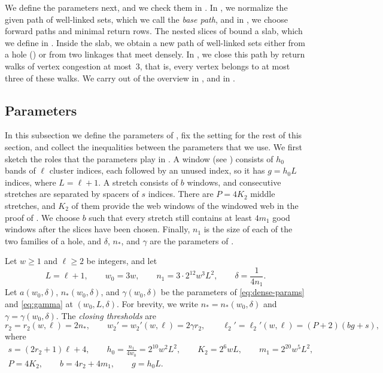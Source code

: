 \documentclass[fontsize=12pt,leading=14pt]{fullpaper}
\newcounter{step}
\begin{document}
We define the parameters next, and we check them in .
In , we normalize the given path of well-linked sets, which we call the \emph{base path}, and in , we choose forward paths and minimal return rows.
The nested slices of  bound a slab, which we define in .
Inside the slab, we obtain a new path of well-linked sets either from a hole () or from two linkages that meet densely.
In , we close this path by return walks of vertex congestion at most~$3$, that is, every vertex belongs to at most three of these walks.
We carry out  of the overview in , and  in .

\subsection{Parameters}\label{sec:stage2-params}

In this subsection we define the parameters of , fix the setting for the rest of this section, and collect the inequalities between the parameters that we use.
We first sketch the roles that the parameters play in .
A window (see ) consists of $h_0$ bands of $\ell$ cluster indices, each followed by an unused index, so it has $g=h_0L$ indices, where $L=\ell+1$.
A stretch consists of $b$ windows, and consecutive stretches are separated by spacers of $s$ indices.
There are $P=4K_2$ middle stretches, and $K_2$ of them provide the web windows of the windowed web in the proof of .
We choose $b$ such that every stretch still contains at least $4m_1$ good windows after the slices have been chosen.
Finally, $n_1$ is the size of each of the two families of a hole, and $\delta$, $n_*$, and $\gamma$ are the parameters of .

\begin{definition}\label{def:closing-params}
  Let $w\ge1$ and $\ell\ge2$ be integers, and let
  \[
    L=\ell+1,\qquad w_0=3w,\qquad n_1=3\cdot2^{12}w^3L^2,\qquad\delta=\frac1{4n_1}.
  \]
  Let $a(w_0,\delta)$, $n_*(w_0,\delta)$, and $\gamma(w_0,\delta)$ be the parameters of \eqref{eq:dense-params} and \eqref{eq:gamma} at $(w_0,L,\delta)$.
  For brevity, we write $n_*=n_*(w_0,\delta)$ and $\gamma=\gamma(w_0,\delta)$.
  The \emph{closing thresholds} are
  \[
    r_2=r_2(w,\ell)=2n_*,\qquad w_2'=w_2'(w,\ell)=2\gamma r_2,\qquad\ell_2'=\ell_2'(w,\ell)=(P+2)(bg+s),
  \]
  where
  \begin{gather*}
    s=(2r_2+1)\ell+4,\qquad h_0=\frac{n_1}{4w_0}=2^{10}w^2L^2,\qquad K_2=2^6wL,\qquad m_1=2^{20}w^5L^2,\\
    P=4K_2,\qquad b=4r_2+4m_1,\qquad g=h_0L.
  \end{gather*}
\end{definition}
\end{document}
